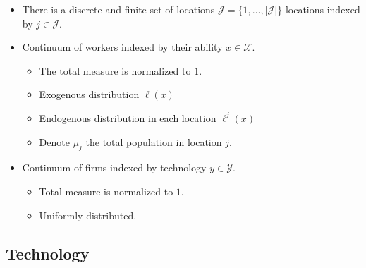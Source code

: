 \documentclass[
  letterpaper,
  DIV=11,
  numbers=noendperiod]{scrreprt}
\providecommand{\tightlist}{%
  \setlength{\itemsep}{0pt}\setlength{\parskip}{0pt}}\usepackage{longtable,booktabs,array}
\begin{document}
\begin{itemize}
\tightlist
\item
  There is a discrete and finite set of locations
  \(\mathcal{J}=\{1,\dots,|\mathcal{J}|\}\) locations indexed by
  \(j\in\mathcal{J}\).
\item
  Continuum of workers indexed by their ability \(x\in \mathcal{X}\).

  \begin{itemize}
  \tightlist
  \item
    The total measure is normalized to \(1\).
  \item
    Exogenous distribution \(\ell(x)\)
  \item
    Endogenous distribution in each location \(\ell^{j}(x)\)
  \item
    Denote \(\mu_j\) the total population in location \(j\).
  \end{itemize}
\item
  Continuum of firms indexed by technology \(y\in \mathcal{Y}\).

  \begin{itemize}
  \tightlist
  \item
    Total measure is normalized to \(1\).
  \item
    Uniformly distributed.
  \end{itemize}
\end{itemize}

\hypertarget{technology}{%
\subsection{Technology}\label{technology}}
\end{document}
